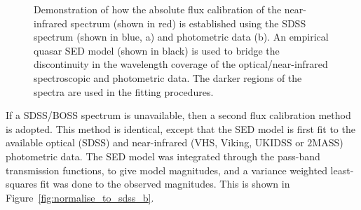 \begin{figure}
    \captionsetup[subfigure]{labelformat=empty}
    \centering
    \subfloat[\label{fig:normalise_to_sdss_a}]{}
    \subfloat[\label{fig:normalise_to_sdss_b}]{}    
    \caption[{}]{Demonstration of how the absolute flux calibration of the near-infrared spectrum (shown in red) is established using the SDSS spectrum (shown in blue, a) and photometric data (b). An empirical quasar SED model (shown in black) is used to bridge the discontinuity in the wavelength coverage of the optical/near-infrared spectroscopic and photometric data. The darker regions of the spectra are used in the fitting procedures.}     
    \label{fig:normalise_to_sdss}
\end{figure}

If a SDSS/BOSS spectrum is unavailable, then a second flux calibration method is adopted. 
This method is identical, except that the SED model is first fit to the available optical (SDSS) and near-infrared (VHS, Viking, UKIDSS or $2$MASS) photometric data. 
The SED model was integrated through the pass-band transmission functions, to give model magnitudes, and a variance weighted least-squares fit was done to the observed magnitudes. 
This is shown in Figure~\ref{fig:normalise_to_sdss_b}. 

